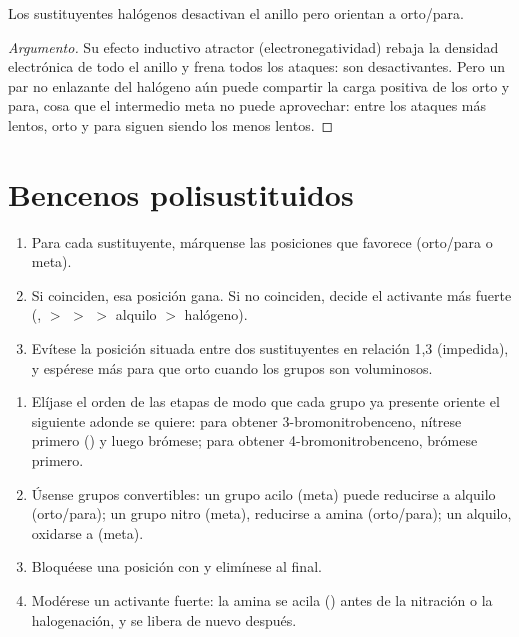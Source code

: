 \begin{proposition}[Halógenos]\label{prop:b2:aromatic-substitution:halogens}
Los sustituyentes halógenos desactivan el anillo pero orientan a orto/para.
\end{proposition}

\begin{proof}[Argumento]
Su efecto inductivo atractor (electronegatividad) rebaja la densidad electrónica de todo el anillo
y frena todos los ataques: son desactivantes. Pero un par no enlazante del halógeno aún puede compartir la
carga positiva de los  orto y para, cosa que el intermedio meta no puede
aprovechar: entre los ataques más lentos, orto y para siguen siendo los menos lentos.
\end{proof}

\section{Bencenos polisustituidos}

\begin{method}\label{met:b2:aromatic-substitution:predict-position}
\begin{enumerate}
  \item Para cada sustituyente, márquense las posiciones que favorece (orto/para o meta).
  \item Si coinciden, esa posición gana. Si no coinciden, decide el activante más fuerte
        (,  $>$  $>$  $>$ alquilo $>$ halógeno).
  \item Evítese la posición situada entre dos sustituyentes en relación 1,3 (impedida), y
        espérese más para que orto cuando los grupos son voluminosos.
\end{enumerate}
\end{method}

\begin{method}\label{met:b2:aromatic-substitution:plan-aromatic}
\begin{enumerate}
  \item Elíjase el orden de las etapas de modo que cada grupo ya presente oriente el siguiente
        adonde se quiere: para obtener 3-bromonitrobenceno, nítrese primero () y luego
        brómese; para obtener 4-bromonitrobenceno, brómese primero.
  \item Úsense grupos convertibles: un grupo acilo (meta) puede reducirse a alquilo (orto/para);
        un grupo nitro (meta), reducirse a amina (orto/para); un alquilo, oxidarse a
         (meta).
  \item Bloquéese una posición con  y elimínese al final.
  \item Modérese un activante fuerte: la amina se acila () antes de la nitración o la
        halogenación, y se libera de nuevo después.
\end{enumerate}
\end{method}

